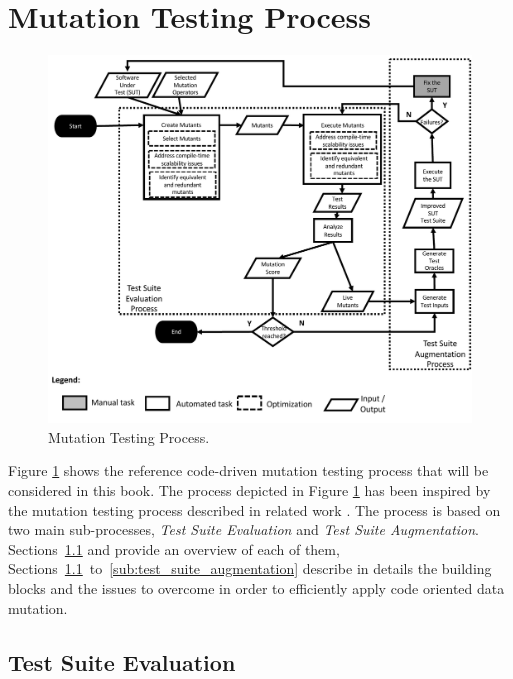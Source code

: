 
\section{Mutation Testing Process}
\label{sec:process}

	\begin{figure}
	\centering
		\includegraphics[width=\textwidth]{images/process}
		\caption{Mutation Testing Process.}
		\label{fig:code:process}
	\end{figure}

Figure \ref{fig:code:process} shows the reference code-driven mutation testing process that will be considered in this book. The process depicted in Figure \ref{fig:code:process} has been inspired by the mutation testing process described in related work \cite{offutt2001mutation,papadakis2019mutation}. The process is based on two main sub-processes, \emph{Test Suite Evaluation} and \emph{Test Suite Augmentation}. Sections~\ref{sub:test_suite_evaluation} and  provide an overview of each of them, Sections~\ref{sub:test_suite_evaluation}~to~\ref{sub:test_suite_augmentation} describe in details the building blocks and the issues to overcome in order to efficiently apply code oriented data mutation.

\subsection{Test Suite Evaluation} %
\label{sub:test_suite_evaluation}

